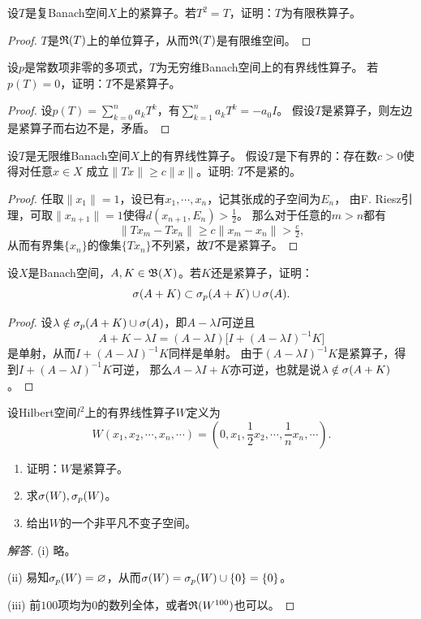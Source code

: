 \begin{5}
    设$T$是复Banach空间$X$上的紧算子。若$T^2=T$，证明：$T$为有限秩算子。
\end{5}
\begin{proof}
    $T$是$\mathfrak{R}(T)$上的单位算子，从而$\mathfrak{R}(T)$是有限维空间。
\end{proof}

\begin{6}
    设$p$是常数项非零的多项式，$T$为无穷维Banach空间上的有界线性算子。
    若$p(T)=0$，证明：$T$不是紧算子。
\end{6}
\begin{proof}
    设$p(T)=\sum\limits_{k=0}^na_kT^k$，有$\sum\limits_{k=1}^na_kT^k=-a_0I$。
    假设$T$是紧算子，则左边是紧算子而右边不是，矛盾。
\end{proof}

\begin{7}
    设$T$是无限维Banach空间$X$上的有界线性算子。
    假设$T$是下有界的：存在数$c>0$使得对任意$x \in X$
    成立$\|Tx\| \geqslant c\|x\|$。证明: $T$不是紧的。
\end{7}
\begin{proof}
    任取$\|x_1\|=1$，设已有$x_1,\cdots,x_n$，记其张成的子空间为$E_n$，
    由F. Riesz引理，可取$\|x_{n+1}\|=1$使得$d(x_{n+1},E_n)>\frac{1}{2}$。
    那么对于任意的$m>n$都有
    \[\|Tx_m-Tx_n\|\geqslant c\|x_m-x_n\|>\tfrac{c}{2},\]
    从而有界集$\{x_n\}$的像集$\{Tx_n\}$不列紧，故$T$不是紧算子。
\end{proof}

\begin{8}
    设$X$是Banach空间，$A,K\in\mathfrak{B}(X)$。若$K$还是紧算子，证明：
    \[\sigma(A+K)\subset\sigma_p(A+K)\cup\sigma(A).\]
\end{8}
\begin{proof}
    设$\lambda\notin\sigma_p(A+K)\cup\sigma(A)$，即$A-\lambda I$可逆且
    \[A+K-\lambda I=(A-\lambda I)\big[I+(A-\lambda I)^{-1}K\big]\]
    是单射，从而$I+(A-\lambda I)^{-1}K$同样是单射。
    由于$(A-\lambda I)^{-1}K$是紧算子，得到$I+(A-\lambda I)^{-1}K$可逆，
    那么$A-\lambda I+K$亦可逆，也就是说$\lambda\notin\sigma(A+K)$。
\end{proof}

\begin{9}
    设Hilbert空间$l^2$上的有界线性算子$W$定义为
    \[W(x_1,x_2,\cdots,x_n,\cdots)
    =\left(0,x_1,\frac{1}{2}x_2,\cdots,\frac{1}{n}x_n,\cdots\right).\]
    \begin{enumerate}[label=(\roman*)]
        \item 证明：$W$是紧算子。
        \item 求$\sigma(W),\sigma_p(W)$。
        \item 给出$W$的一个非平凡不变子空间。
    \end{enumerate}
\end{9}
\begin{proof}[解答]
    (i) 略。

    (ii) 易知$\sigma_p(W)=\varnothing$，从而$\sigma(W)=\sigma_p(W)\cup\{0\}=\{0\}$。

    (iii) 前$100$项均为$0$的数列全体，或者$\mathfrak{R}(W^{100})$也可以。
\end{proof}

